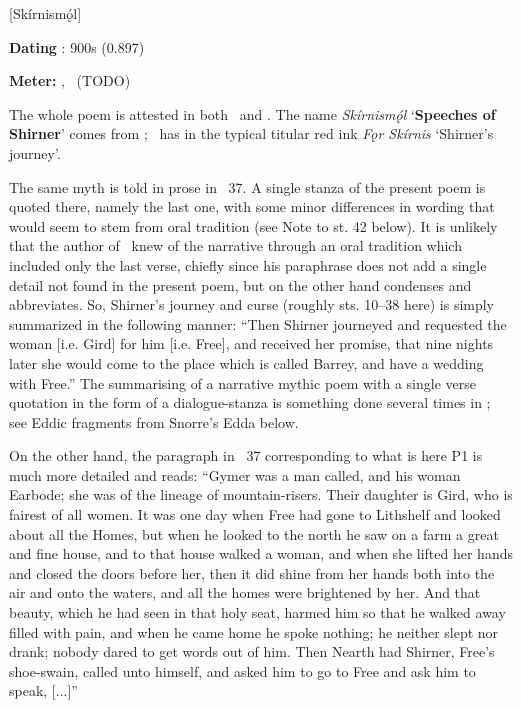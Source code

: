 [Skírnismǫ́l]

\begin{flushright}%
\textbf{Dating} \parencite{Sapp2022}: 900s (0.897)

\textbf{Meter:} \Ljodahattr, \Galdralag\ (TODO)%
\end{flushright}


The whole poem is attested in both \Regius\ and \AM. The name \emph{Skírnismǫ́l} ‘\textbf{Speeches of Shirner}’ comes from \AM; \Regius\ has in the typical titular red ink \emph{Fǫr Skírnis} ‘Shirner’s journey’.

The same myth is told in prose in \Gylfaginning\ 37.  A single stanza of the present poem is quoted there, namely the last one, with some minor differences in wording that would seem to stem from oral tradition (see Note to st. 42 below).  It is unlikely that the author of \Gylfaginning\ knew of the narrative through an oral tradition which included only the last verse, chiefly since his paraphrase does not add a single detail not found in the present poem, but on the other hand condenses and abbreviates.  So, Shirner’s journey and curse (roughly sts. 10–38 here) is simply summarized in the following manner: “Then Shirner journeyed and requested the woman [i.e. Gird] for him [i.e. Free], and received her promise, that nine nights later she would come to the place which is called Barrey, and have a wedding with Free.”  The summarising of a narrative mythic poem with a single verse quotation in the form of a dialogue-stanza is something done several times in \Gylfaginning; see Eddic fragments from Snorre’s Edda below.

On the other hand, the paragraph in \Gylfaginning\ 37 corresponding to what is here P1 is much more detailed and reads: “Gymer was a man called, and his woman Earbode; she was of the lineage of mountain-risers. Their daughter is Gird, who is fairest of all women.  It was one day when Free had gone to Lithshelf and looked about all the Homes, but when he looked to the north he saw on a farm a great and fine house, and to that house walked a woman, and when she lifted her hands and closed the doors before her, then it did shine from her hands both into the air and onto the waters, and all the homes were brightened by her.  And that beauty, which he had seen in that holy seat, harmed him so that he walked away filled with pain, and when he came home he spoke nothing; he neither slept nor drank; nobody dared to get words out of him.  Then Nearth had Shirner, Free’s shoe-swain, called unto himself, and asked him to go to Free and ask him to speak, [...]”

